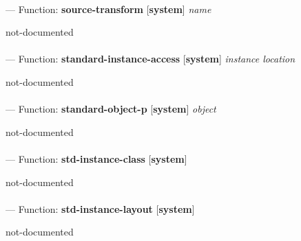 \paragraph{}
\label{SYSTEM:SOURCE-TRANSFORM}
--- Function: \textbf{source-transform} [\textbf{system}] \textit{name}

\begin{adjustwidth}{5em}{5em}
not-documented
\end{adjustwidth}

\paragraph{}
\label{SYSTEM:STANDARD-INSTANCE-ACCESS}
--- Function: \textbf{standard-instance-access} [\textbf{system}] \textit{instance location}

\begin{adjustwidth}{5em}{5em}
not-documented
\end{adjustwidth}

\paragraph{}
\label{SYSTEM:STANDARD-OBJECT-P}
--- Function: \textbf{standard-object-p} [\textbf{system}] \textit{object}

\begin{adjustwidth}{5em}{5em}
not-documented
\end{adjustwidth}

\paragraph{}
\label{SYSTEM:STD-INSTANCE-CLASS}
--- Function: \textbf{std-instance-class} [\textbf{system}] \textit{}

\begin{adjustwidth}{5em}{5em}
not-documented
\end{adjustwidth}

\paragraph{}
\label{SYSTEM:STD-INSTANCE-LAYOUT}
--- Function: \textbf{std-instance-layout} [\textbf{system}] \textit{}

\begin{adjustwidth}{5em}{5em}
not-documented
\end{adjustwidth}


